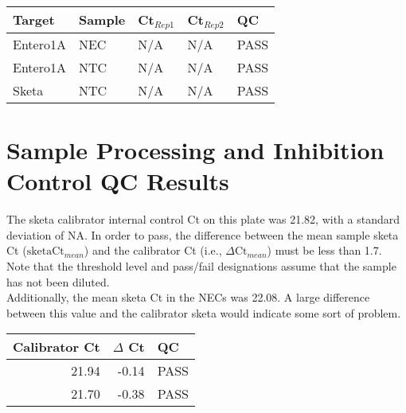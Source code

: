 \documentclass{article}\usepackage[]{graphicx}\usepackage[]{color}
\begin{document}
\begin{table}[ht]
\centering
\begin{tabular}{lllll}
  \hline
Target & Sample & Ct$_{Rep1}$ & Ct$_{Rep2}$ & QC \\ 
  \hline
Entero1A & NEC & N/A & N/A & PASS \\ 
  Entero1A & NTC & N/A & N/A & PASS \\ 
  Sketa & NTC & N/A & N/A & PASS \\ 
   \hline
\end{tabular}
\end{table}


\pagebreak
\section{Sample Processing and Inhibition Control QC Results}

The sketa calibrator internal control Ct on this plate was 21.82, with a standard deviation of NA. In order to pass,
the difference between the mean sample sketa Ct ($\text{sketaCt}_{mean}$) and the calibrator Ct (i.e., $\Delta \text{Ct}_{mean}$)
must be less than 1.7. Note that the threshold level and pass/fail designations assume that the sample has not
been diluted. \\

Additionally, the mean sketa Ct in the NECs was 22.08. A large difference between this value and the calibrator sketa would indicate some sort of problem.

\begin{table}[ht]
\centering
\begin{tabular}{rrl}
  \hline
Calibrator Ct & $\Delta$ Ct & QC \\ 
  \hline
21.94 & -0.14 & PASS \\ 
  21.70 & -0.38 & PASS \\ 
   \hline
\end{tabular}
\end{table}
\end{document}

